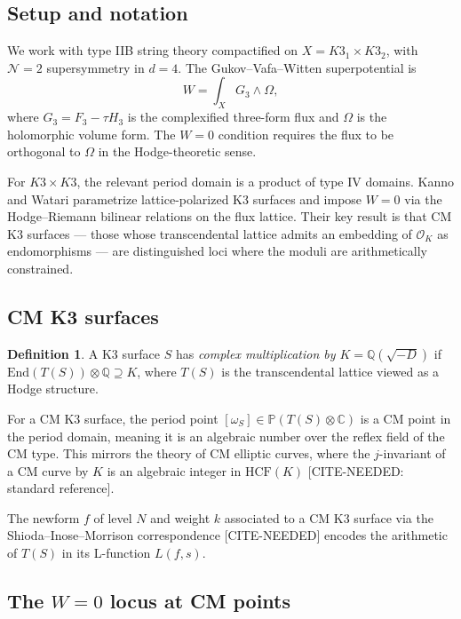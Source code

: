 \documentclass[12pt,a4paper]{article}
\theoremstyle{plain}
\theoremstyle{definition}
\newtheorem{definition}[theorem]{Definition}
\newcommand{\Q}{\mathbb{Q}}
\newcommand{\C}{\mathbb{C}}
\newcommand{\OK}{\mathcal{O}_K}
\newcommand{\HCF}{\mathrm{HCF}}
\newcommand{\End}{\mathrm{End}}
\begin{document}
\subsection{Setup and notation}

We work with type IIB string theory compactified on $X = K3_1 \times K3_2$,
with $\mathcal{N}=2$ supersymmetry in $d=4$. The Gukov--Vafa--Witten
superpotential is
\[
  W = \int_X G_3 \wedge \Omega,
\]
where $G_3 = F_3 - \tau H_3$ is the complexified three-form flux and
$\Omega$ is the holomorphic volume form. The $W=0$ condition requires the
flux to be orthogonal to $\Omega$ in the Hodge-theoretic sense.

For $K3 \times K3$, the relevant period domain is a product of type IV
domains. Kanno and Watari \cite{KannoWatari2024} parametrize lattice-polarized
K3 surfaces and impose $W=0$ via the Hodge--Riemann bilinear relations on
the flux lattice. Their key result is that CM K3 surfaces --- those whose
transcendental lattice admits an embedding of $\OK$ as endomorphisms --- are
distinguished loci where the moduli are arithmetically constrained.

\subsection{CM K3 surfaces}

\begin{definition}
  A K3 surface $S$ has \emph{complex multiplication by $K = \Q(\sqrt{-D})$}
  if $\End(T(S)) \otimes \Q \supseteq K$, where $T(S)$ is the transcendental
  lattice viewed as a Hodge structure.
\end{definition}

For a CM K3 surface, the period point $[\omega_S] \in \mathbb{P}(T(S) \otimes \C)$
is a CM point in the period domain, meaning it is an algebraic number over
the reflex field of the CM type. This mirrors the theory of CM elliptic
curves, where the $j$-invariant of a CM curve by $K$ is an algebraic integer
in $\HCF(K)$ \cite{Silverman} [CITE-NEEDED: standard reference].

The newform $f$ of level $N$ and weight $k$ associated to a CM K3 surface
via the Shioda--Inose--Morrison correspondence [CITE-NEEDED] encodes the
arithmetic of $T(S)$ in its L-function $L(f,s)$.

\subsection{The $W=0$ locus at CM points}
\end{document}
